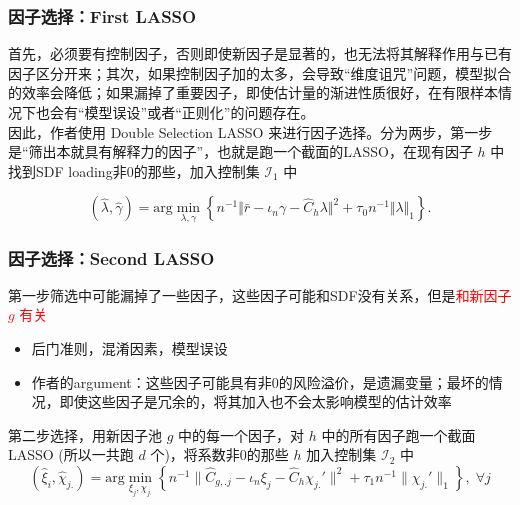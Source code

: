 \documentclass[
  UTF8,
  xcolor={dvipsnames,rgb},
  hyperref={colorlinks, citecolor=orange, linkcolor=black},
  aspectratio=169
  ]{beamer}
\begin{document}
\begin{frame}
    \frametitle{因子选择：First LASSO}
    首先，必须要有控制因子，否则即使新因子是显著的，也无法将其解释作用与已有因子区分开来；其次，如果控制因子加的太多，会导致``维度诅咒''问题，模型拟合的效率会降低；如果漏掉了重要因子，即使估计量的渐进性质很好，在有限样本情况下也会有``模型误设''或者``正则化''的问题存在。
    \\
    \vspace{1em}
    因此，作者使用 Double Selection LASSO 来进行因子选择。分为两步，第一步是``筛出本就具有解释力的因子''，也就是跑一个截面的LASSO，在现有因子 \(h\) 中找到SDF loading非0的那些，加入控制集 \(\mathcal{I}_1\) 中

    \[( \hat{\lambda},\hat{\gamma} ) = \textrm{arg} \min_{\lambda,\gamma} \left\{ n^{-1} \Vert \bar{r}-\iota_{n}\gamma-\hat{C}_{h}\lambda \Vert^{2} + \tau_{0}n^{-1} \Vert \lambda \Vert_{1} \right\} .\]

\end{frame}

\begin{frame}
    \frametitle{因子选择：Second LASSO}
    第一步筛选中可能漏掉了一些因子，这些因子可能和SDF没有关系，但是\textcolor{red}{和新因子 \(g\) 有关}
    \begin{itemize}
        \item 后门准则，混淆因素，模型误设
        \item 作者的argument：这些因子可能具有非0的风险溢价，是遗漏变量；最坏的情况，即使这些因子是冗余的，将其加入也不会太影响模型的估计效率
    \end{itemize}
    第二步选择，用新因子池 \(g\) 中的每一个因子，对 \(h\) 中的所有因子跑一个截面LASSO (所以一共跑 \(d\) 个)，将系数非0的那些 \(h\) 加入控制集 \(\mathcal{I}_2\) 中
    \[(\hat{\xi}_{i},\hat{\chi}_{j.}) = \textrm{arg} \min_{\xi_{j},\chi_{j.}} \left\{ n^{-1}\lVert \hat{C}_{g,.j}-\iota_{n}\xi_{j}-\hat{C}_{h}\chi_{j.}' \rVert^{2} + \tau_{1}n^{-1}\lVert \chi_{j.}' \rVert_{1}  \right\} , \; \forall j\]
\end{frame}
\end{document}
